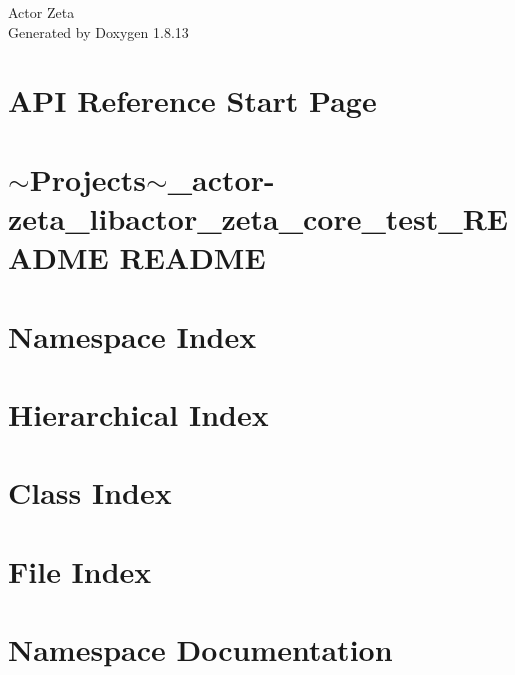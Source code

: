 \documentclass[twoside]{book}
\newcommand{\+}{\discretionary{\mbox{\scriptsize$\hookleftarrow$}}{}{}}
\newcommand{\clearemptydoublepage}{%
  \newpage{\pagestyle{empty}\cleardoublepage}%
}
\begin{document}
\hypersetup{pageanchor=false,
             bookmarksnumbered=true,
             pdfencoding=unicode
            }
\begin{titlepage}
\vspace*{7cm}
\begin{center}%
{\Large Actor Zeta }\\
\vspace*{1cm}
{\large Generated by Doxygen 1.8.13}\\
\end{center}
\end{titlepage}
\clearemptydoublepage
{}
\tableofcontents
\clearemptydoublepage
{}
\hypersetup{pageanchor=true}

\chapter{A\+PI Reference Start Page}
\label{index}\hypertarget{index}{}
\chapter{$\sim$\+Projects$\sim$\+\_\+actor-\/zeta\+\_\+libactor\+\_\+zeta\+\_\+core\+\_\+test\+\_\+\+R\+E\+A\+D\+ME R\+E\+A\+D\+ME}
\label{md__cygdrive_d_Kuznya_}

\chapter{Namespace Index}

\chapter{Hierarchical Index}

\chapter{Class Index}

\chapter{File Index}

\chapter{Namespace Documentation}








\end{document}
